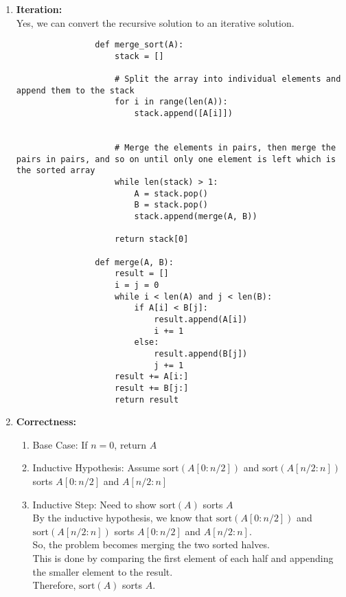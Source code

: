 \documentclass[a4paper]{article}
\begin{document}
\begin{enumerate}
\begin{enumerate}
            \item \textbf{Iteration:} \\
            Yes, we can convert the recursive solution to an iterative solution.
            \lstset{language=Python}
            \begin{lstlisting}
                def merge_sort(A):
                    stack = []

                    # Split the array into individual elements and append them to the stack
                    for i in range(len(A)):
                        stack.append([A[i]])
                    

                    # Merge the elements in pairs, then merge the pairs in pairs, and so on until only one element is left which is the sorted array
                    while len(stack) > 1:
                        A = stack.pop()
                        B = stack.pop()
                        stack.append(merge(A, B))
                    
                    return stack[0]

                def merge(A, B):
                    result = []
                    i = j = 0
                    while i < len(A) and j < len(B):
                        if A[i] < B[j]:
                            result.append(A[i])
                            i += 1
                        else:
                            result.append(B[j])
                            j += 1
                    result += A[i:]
                    result += B[j:]
                    return result
            \end{lstlisting}

            \newpage
            \item \textbf{Correctness:} \\
            \begin{enumerate}
                \item Base Case: If $n = 0$, return $A$ \\
                \item Inductive Hypothesis: Assume $\text{sort}(A[0:n/2])$ and $\text{sort}(A[n/2:n])$ sorts $A[0:n/2]$ and $A[n/2:n]$ \\
                \item Inductive Step: Need to show $\text{sort}(A)$ sorts $A$ \\

                By the inductive hypothesis, we know that $\text{sort}(A[0:n/2])$ and $\text{sort}(A[n/2:n])$ sorts $A[0:n/2]$ and $A[n/2:n]$. \\
                So, the problem becomes merging the two sorted halves. \\
                This is done by comparing the first element of each half and appending the smaller element to the result. \\
                Therefore, $\text{sort}(A)$ sorts $A$. \\
            \end{enumerate}
        \end{enumerate}
    \end{enumerate}
\end{document}

